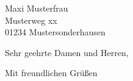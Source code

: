 \documentclass[12pt,a4paper]{letter}
\begin{document}
 
    \begin{letter}{%
            Maxi Musterfrau\\
            Musterweg xx\\
            01234 Mustersonderhausen
        } 
        
        \opening{Sehr geehrte Damen und Herren,} 

        \blindtext
     
        \closing{Mit freundlichen Grüßen}
        

        
    \end{letter} 
\end{document}
